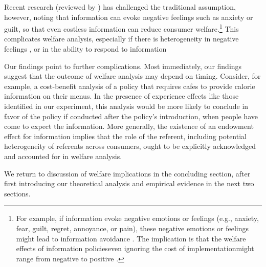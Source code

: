 Recent research (reviewed by \citet{golmanInformationAvoidance2017}) has challenged the traditional assumption, however, noting that information can evoke negative feelings such as anxiety or guilt, so that even costless information can reduce consumer welfare.\footnote{For example, if information evoke negative emotions or feelings (e.g., anxiety, fear, guilt, regret, annoyance, or pain), these negative emotions or feelings might lead to information avoidance \citep{koszegiHealthAnxietyPatient2003,danaExploitingMoralWiggle2007,karlssonOstrichEffectSelective2009,sweenyInformationAvoidanceWho2010,osterOptimalExpectationsLimited2013,grossmanStrategicIgnoranceRobustness2014,hertwigHomoIgnoransDeliberately2016,onwezenWhenIndifferenceAmbivalence2016,savolainenApproachingAffectiveBarriers2016,thunstromStrategicSelfignorance2016,grossmanSelfImageWillfulIgnorance2017,damgaardHiddenCostsNudging2018,thunstromEndogenousAttentionCosts2019,sunsteinRuiningPopcornWelfare2019}. The implication is that the welfare effects of information policies\textemdash even ignoring the cost of implementation\textemdash might range from negative to positive \citep{damgaardHiddenCostsNudging2018,allcottWelfareEffectsNudges2019,buteraDeadweightLossSocial2019,rafiqHowMuchCalorieundefined/ed,thunstromWelfareEffectsNudges2020}. } This complicates welfare analysis, especially if there is heterogeneity in negative feelings \citep{sunsteinRuiningPopcornWelfare2019}, or in the ability to respond to information \citep{robertsNudgeProofDistributiveJustice2018}

Our findings point to further complications. Most immediately, our findings suggest that the outcome of welfare analysis may depend on timing. Consider, for example, a cost-benefit analysis of a policy that requires cafes to provide calorie information on their menus. In the presence of experience effects like those identified in our experiment, this analysis would be more likely to conclude in favor of the policy if conducted after the policy’s introduction, when people have come to expect the information. More generally, the existence of an endowment effect for information implies that the role of the referent, including potential heterogeneity of referents across consumers, ought to be explicitly acknowledged and accounted for in welfare analysis.

We return to discussion of welfare implications in the concluding section, after first introducing our theoretical analysis and empirical evidence in the next two sections.

